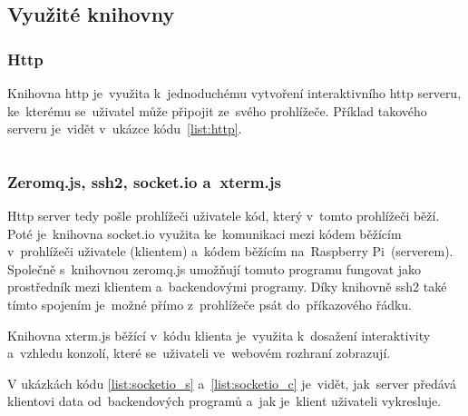 \subsection{Využité knihovny}
\subsubsection{Http}
Knihovna http je~využita k~jednoduchému vytvoření interaktivního http serveru, ke~kterému se~uživatel může připojit ze~svého prohlížeče. Příklad takového serveru je~vidět v~ukázce kódu~\ref{list:http}.
\begin{code}
    \inputminted[frame=lines,fontsize=\footnotesize{}, linenos, breaklines]{js}{code_examples/http_static_files.js}
\end{code}
    
\subsubsection{Zeromq.js, ssh2, socket.io a~xterm.js}
Http server tedy pošle prohlížeči uživatele kód, který v~tomto prohlížeči běží. Poté je~knihovna socket.io využita ke~komunikaci mezi kódem běžícím v~prohlížeči uživatele (klientem) a~kódem běžícím na~Raspberry Pi~(serverem).
Společně s~knihovnou zeromq.js umožňují tomuto programu fungovat jako prostředník mezi klientem a~backendovými programy. Díky knihovně ssh2 také tímto spojením je~možné přímo z~prohlížeče psát do~příkazového řádku.

Knihovna xterm.js běžící v~kódu klienta je~využita k~dosažení interaktivity a~vzhledu konzolí, které se~uživateli ve~webovém rozhraní zobrazují.

V ukázkách kódu \ref{list:socketio_s} a~\ref{list:socketio_c} je~vidět, jak~server předává klientovi data od~backendových programů a~jak je~klient uživateli vykresluje.
\begin{code}
    \inputminted[frame=lines,fontsize=\footnotesize{}, linenos, breaklines]{js}{code_examples/socketio_server.js}
\end{code}
\begin{code}
    \inputminted[frame=lines,fontsize=\footnotesize{}, linenos, breaklines]{js}{code_examples/socketio_client.js}
\end{code}


